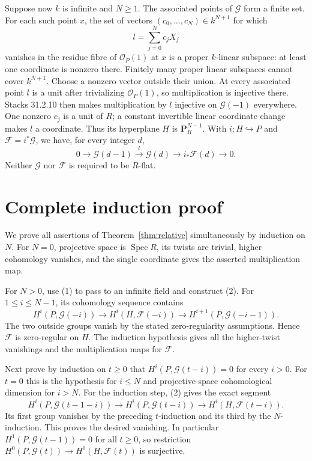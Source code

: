 \documentclass[11pt]{article}
\newcommand{\OO}{\mathcal O}
\newcommand{\GG}{\mathcal G}
\newcommand{\FF}{\mathcal F}
\begin{document}
Suppose now $k$ is infinite and $N\geq1$. The associated points of
$\GG$ form a finite set. For each such point $x$, the set of vectors
$(c_0,\ldots,c_N)\in k^{N+1}$ for which
\[
 l=\sum_{j=0}^N c_j X_j
\]
vanishes in the residue fibre of $\OO_P(1)$ at $x$ is a proper
$k$-linear subspace: at least one coordinate is nonzero there. Finitely
many proper linear subspaces cannot cover $k^{N+1}$. Choose a nonzero
vector outside their union. At every associated point $l$ is a unit
after trivializing $\OO_P(1)$, so multiplication is injective there.
Stacks 31.2.10 then makes multiplication by $l$ injective on
$\GG(-1)$ everywhere. One nonzero $c_j$ is a unit of $R$;
a constant invertible linear coordinate change makes $l$ a coordinate.
Thus its hyperplane $H$ is $\mathbf P^{N-1}_R$. With
$i:H\hookrightarrow P$ and $\FF=i^*\GG$, we have, for every integer $d$,
\[
 0\longrightarrow\GG(d-1)\xrightarrow{l}\GG(d)
   \longrightarrow i_*\FF(d)\longrightarrow0.              \tag{2}
\]
Neither $\GG$ nor $\FF$ is required to be $R$-flat.

\section{Complete induction proof}
We prove all assertions of Theorem~\ref{thm:relative} simultaneously
by induction on $N$. For $N=0$, projective space is $\operatorname{Spec}R$,
its twists are trivial, higher cohomology vanishes, and the single
coordinate gives the asserted multiplication map.

For $N>0$, use (1) to pass to an infinite field and construct (2).
For $1\leq i\leq N-1$, its cohomology sequence contains
\[
 H^i(P,\GG(-i))\longrightarrow H^i(H,\FF(-i))
  \longrightarrow H^{i+1}(P,\GG(-i-1)).
\]
The two outside groups vanish by the stated zero-regularity assumptions.
Hence $\FF$ is zero-regular on $H$. The induction hypothesis gives
all the higher-twist vanishings and the multiplication maps for $\FF$.

Next prove by induction on $t\geq0$ that
$H^i(P,\GG(t-i))=0$ for every $i>0$. For $t=0$ this is the hypothesis
for $i\leq N$ and projective-space cohomological dimension for $i>N$.
For the induction step, (2) gives the exact segment
\[
 H^i(P,\GG(t-1-i))\longrightarrow H^i(P,\GG(t-i))
  \longrightarrow H^i(H,\FF(t-i)).
\]
Its first group vanishes by the preceding $t$-induction and its third
by the $N$-induction. This proves the desired vanishing. In particular
$H^1(P,\GG(t-1))=0$ for all $t\geq0$, so restriction
$H^0(P,\GG(t))\to H^0(H,\FF(t))$ is surjective.
\end{document}
